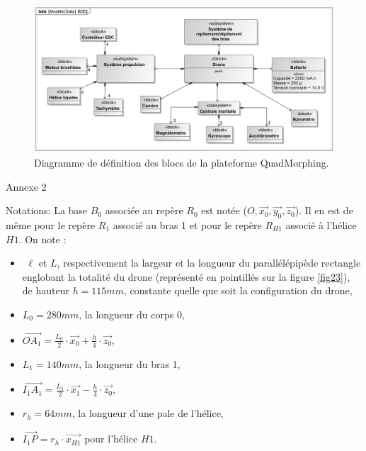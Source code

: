 \begin{figure}[ht!]
\begin{center}
 \includegraphics[width=0.85\linewidth]{img/fig22}
\end{center}
\caption{\label{fig22} Diagramme de définition des blocs de la plateforme QuadMorphing.}
\end{figure}

\newpage

\begin{center}
\Large{Annexe 2}
\end{center}

Notations:
La base $B_0$ associée au repère $R_0$ est notée ($O,\vec{x_0},\vec{y_0},\vec{z_0}$). Il en est de même pour le repère $R_1$ associé au bras 1 et pour le repère $R_{H1}$ associé à l’hélice $H1$. On note :
\begin{itemize}
 \item­ $\ell$ et $L$, respectivement la largeur et la longueur du parallélépipède rectangle englobant la totalité du drone (représenté en pointillés sur la figure \ref{fig23}), de hauteur $h=115mm$, constante quelle que soit la configuration du drone,
 \item $L_0=280mm$, la longueur du corps 0,
 \item $\overrightarrow{OA_1}=\frac{L_0}{2}\cdot \vec{x_0}+\frac{h}{4}\cdot \vec{z_0}$,
 \item $L_1=140mm$, la longueur du bras 1,
 \item $\overrightarrow{I_1A_1}=\frac{L_1}{2}\cdot \vec{x_1}-\frac{h}{4}\cdot \vec{z_0}$,
 \item $r_h=64mm$, la longueur d’une pale de l’hélice,
 \item $\overrightarrow{I_1P}=r_h\cdot\vec{x_{H1}}$ pour l’hélice $H1$.
\end{itemize}

